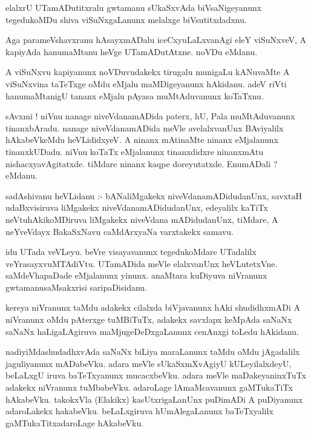 \documentclass{article}
\begin{document}
\begin{mn}
elalxrU  UTamADutitxralu  gwtamanu  sUkaSxvAda  biVsaNigeyanunx  tegedukoMDu  shiva viSuNxgaLanunx  
melalxge  biVsutitxdadxnu.
\end{mn}

\begin{mn}
Aga  parameVshavxranu  hAsayxmADalu  iceCxyuLaLxvanAgi  eleY  viSuNxveV,  A  kapiyAda  hanumaMtanu  heVge  
UTamADutAtxne.  noVDu  eMdanu.
\end{mn}

\begin{mn}
A  viSuNxvu  kapiyanunx  noVDuvudakekx  tirugalu  munigaLu  kANuvaMte  A   viSuNxvina  taTeTxge  oMdu  
eMjalu  maMDigeyanunx  hAkidanu.  adeV  riVti  hanumaMtanigU  tananx  eMjalu  pAyasa  muMtAduvanunx  koTaTxnu.
\end{mn}

\begin{mn}
sAvxmi !  niVnu  nanage  niveVdanamADida  paterx,  hU,  Pala  muMtAduvanunx  tinanxbAradu.  nanage  
niveVdanamADida  meVle  avelalxvanUnx  BAviyalilx  hAkabeVkeMdu  heVLididxyeV.  A  ninanx  mAtinaMte  
ninanx  eMjalanunx  tinanxkUDadu.  niVnu  koTaTx  eMjalanunx  tinanxdidxre  ninanxmAtu  nishacxyavAgitatxde.  
tiMdare  ninanx  kaqpe  doreyutatxde.  EnumADali ?  eMdanu.
\end{mn}

\begin{mn}
sadAshivanu  heVLidanu :- bANaliMgakekx  niveVdanamADidudanUnx,  savxtaH  udaBxvisiruva  liMgakekx  
niveVdanamADidudanUnx,  edeyalilx  kaTiTx neVtuhAkikoMDiruva  liMgakekx  niveVdana  mADidudanUnx,  
tiMdare,  A  neYveVdayx  BakaSxNavu  caMdArxyaNa  varxtakekx  samavu.
\end{mn}

\begin{mn}
idu  UTada  veVLeyu.  beVre  visayavanunx  tegedukoMdare  UTadalilx  veYrasayxvuMTAdiVtu. UTamADida  
meVle  elalxvanUnx  heVLutetxVne.  saMdeVhapaDade  eMjalanunx  yinunx.  anaMtara  kuDiyuva  niVranunx  
gwtamanusaMsakxrisi  saripaDisidanu.
\end{mn}

\begin{mn}
kereya  niVranunx  taMdu  adakekx  cilalxda  biVjavanunx  hAki  shudidhxmADi  A  niVranunx  oMdu  
pAterxge  tuMBiTuTx,  adakekx  savxlapx  keMpAda  saNaNx saNaNx  haLigaLAgiruva  maMjugeDeDxgaLanunx  
cenAnxgi  toLedu  hAkidanu.
\end{mn}

\begin{mn}
nadiyiMdashudadhxvAda  saNaNx  biLiya  maraLanunx  taMdu  oMdu  jAgadalilx  jaguliyanunx  mADabeVku.  
adara  meVle  sUkaSxmXvAgiyU  kULeyilalxdeyU,  beLaLxgU  iruva  baTeTxyanunx  mucacxbeVku.  adara  
meVle  maDakeyaninxTuTx  adakekx  niVranunx  tuMbabeVku.  adaroLage  lAmaMcavanunx  gaMTukaTiTx  hAkabeVku.  
takokxVla (Elakikx) kasUtxrigaLanUnx  puDimADi  A  puDiyanunx  adaroLakekx  hakabeVku.  beLaLxgiruva  
hUmAlegaLanunx  baTeTxyalilx  gaMTukaTitxadaroLage  hAkabeVku.
\end{mn}
\end{document}
